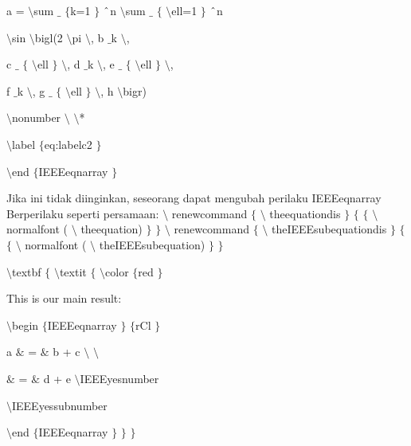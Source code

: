 \noindent 
a =  $  \setminus  $sum $  \_  $ $  \{  $k=1 $  \}  $ $  \string^  $n $  \setminus  $sum $  \_  $ $  \{  $ $  \setminus  $ell=1 $  \}  $ $  \string^  $n \par
\noindent 
 $  \setminus  $sin  $  \setminus  $bigl(2 $  \setminus  $pi  $  \setminus  $, b $  \_  $k  $  \setminus  $, \par
\noindent 
c $  \_  $ $  \{  $ $  \setminus  $ell $  \}  $  $  \setminus  $, d $  \_  $k  $  \setminus  $, e $  \_  $ $  \{  $ $  \setminus  $ell $  \}  $  $  \setminus  $, \par
\noindent 
f $  \_  $k  $  \setminus  $, g $  \_  $ $  \{  $ $  \setminus  $ell $  \}  $  $  \setminus  $, h  $  \setminus  $bigr) \par
\noindent 
 $  \setminus  $nonumber $  \setminus  $ $  \setminus  $* \par
\noindent 
 $  \setminus  $label $  \{  $eq:labelc2 $  \}  $ \par
\noindent 
 $  \setminus  $end $  \{  $IEEEeqnarray $  \}  $ \par
\noindent 
\vspace{12pt}
\noindent 
Jika ini tidak diinginkan, seseorang dapat mengubah perilaku IEEEeqnarray Berperilaku seperti persamaan:  $  \setminus  $ renewcommand  $  \{  $ $  \setminus  $ theequationdis $  \}  $  $  \{  $ $  \{  $ $  \setminus  $ normalfont ( $  \setminus  $ theequation) $  \}  $ $  \}  $  $  \setminus  $ renewcommand  $  \{  $ $  \setminus  $ theIEEEsubequationdis $  \}  $  $  \{  $ $  \{  $ $  \setminus  $ normalfont ( $  \setminus  $ theIEEEsubequation) $  \}  $ $  \}  $ \par
\vspace{12pt}
\noindent 
 $  \setminus  $textbf $  \{  $ $  \setminus  $textit $  \{  $ $  \setminus  $color $  \{  $red $  \}  $ \par
\noindent 
This is our main result: \par
\noindent 
 $  \setminus  $begin $  \{  $IEEEeqnarray $  \}  $ $  \{  $rCl $  \}  $ \par
\noindent 
a  $  \&  $ =  $  \&  $ b + c  $  \setminus  $ $  \setminus  $ \par
\noindent 
 $  \&  $ =  $  \&  $ d + e  $  \setminus  $IEEEyesnumber \par
\noindent 
 $  \setminus  $IEEEyessubnumber \par
\noindent 
 $  \setminus  $end $  \{  $IEEEeqnarray $  \}  $ $  \}  $ $  \}  $ \par
\noindent 
\vspace{12pt}

